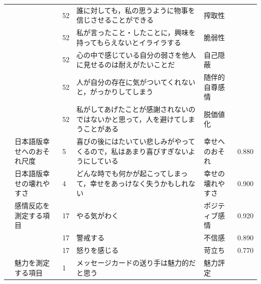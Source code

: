 \begin{landscape}
\begin{longtable}{p{2cm}p{2cm}p{2cm}p{6cm}p{2cm}p{2cm}}
                                 &                                  & 52  & 誰に対しても，私の思うように物事を信じさせることができる                        & 搾取性                  &         \\
                                 &                                  & 52  & 私が言ったこと・したことに，興味を持ってもらえないとイライラする                    & 脆弱性                  &         \\
                                 &                                  & 52  & 心の中で感じている自分の弱さを他人に見せるのは耐えがたいことだ                     & 自己隠蔽                 &         \\
                                 &                                  & 52  & 人が自分の存在に気がついてくれないと，がっかりしてしまう                        & 随伴的自尊感情              &         \\
                                 &                                  & 52  & 私がしてあげたことが感謝されないのではないかと思って，人を避けてしまうことがある            & 脱価値化                 &         \\
        \citet{Namatame202192}   & 日本語版幸せへのおそれ尺度                    & 5   & 喜びの後にはたいてい悲しみがやってくるので，私はあまり喜びすぎないようにしている            & 幸せへのおそれ              & 0.880   \\
                                 & 日本語版幸せの壊れやすさ                     & 4   & どんな時でも何かが起こってしまって，幸せをあっけなく失うかもしれない                  & 幸せの壊れやすさ             & 0.900   \\
        \citet{Ono202192}        & 感情反応を測定する項目                      & 17  & やる気がわく                                              & ポジティブ感情              & 0.920   \\
                                 &                                  & 17  & 警戒する                                                & 不信感                  & 0.890   \\
                                 &                                  & 17  & 怒りを感じる                                              & 苛立ち                  & 0.770   \\
                                 & 魅力を測定する項目                        & 1   & メッセージカードの送り手は魅力的だと思う                                & 魅力評定                 &         \\

\end{longtable}
\end{landscape}
